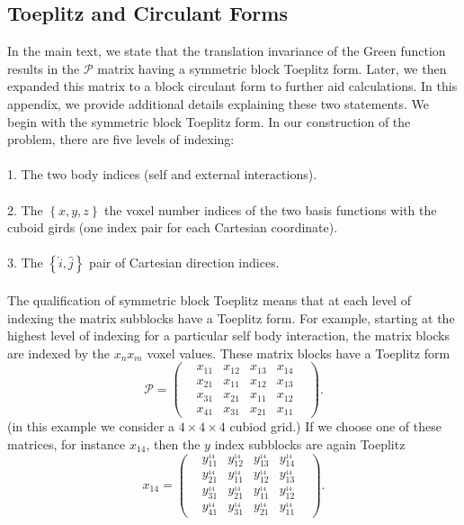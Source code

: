 \documentclass[reprint,aps,prb]{revtex4-2}
\begin{document}
\subsection{Toeplitz and Circulant Forms}
\noindent
In the main text, we state that the translation invariance of the Green function results in the $\mathcal{P}$ matrix having a symmetric block Toeplitz form. Later, we then expanded this matrix to a block circulant form to further aid calculations. In this appendix, we provide additional details explaining these two statements. We begin with the symmetric block Toeplitz form. In our construction of the problem, there are five levels of indexing:\\ \\
1. The two body indices (self and external interactions).\\ \\
2. The $\left\{x,y,z\right\}$ the voxel number indices of the two basis functions with the cuboid girds (one index pair for each Cartesian coordinate).\\ \\
3. The $\left\{\hat{i},\hat{j}\right\}$ pair of Cartesian direction indices.\\ \\
The qualification of symmetric block Toeplitz means that at each level of indexing the matrix subblocks have a Toeplitz form. For example, starting at the highest level of indexing for a particular self body interaction, the matrix blocks are indexed by the $x_{n}x_{m}$ voxel values. These matrix blocks have a Toeplitz form 
\begin{equation}
	\mathcal{P}=
	\begin{pmatrix}
 	&x_{11} &x_{12} &x_{13} &x_{14}\;\;\;\\
 	&x_{21} &x_{11} &x_{12} &x_{13}\;\;\;\\
 	&x_{31} &x_{21} &x_{11} &x_{12}\;\;\;\\
 	&x_{41} &x_{31} &x_{21} &x_{11}\;\;\;	
 	\end{pmatrix}. 
 	\label{toeplitz}
\end{equation} 
(in this example we consider a $4\times 4\times 4$ cubiod grid.) If we choose one of these matrices, for instance $x_{14}$, then the $y$ index subblocks are again Toeplitz
\begin{equation}
  	x_{14}= 
  	\begin{pmatrix}
  	&y^{_{14}}_{11} &y^{_{14}}_{12} &y^{_{14}}_{13} &y^{_{14}}_{14}\;\;\;\\
 	&y^{_{14}}_{21} &y^{_{14}}_{11} &y^{_{14}}_{12} &y^{_{14}}_{13}\;\;\;\\
 	&y^{_{14}}_{31} &y^{_{14}}_{21} &y^{_{14}}_{11} &y^{_{14}}_{12}\;\;\;\\
 	&y^{_{14}}_{41} &y^{_{14}}_{31} &y^{_{14}}_{21} &y^{_{14}}_{11}\;\;\;
	\end{pmatrix}. \nonumber
\end{equation}  
\end{document}
